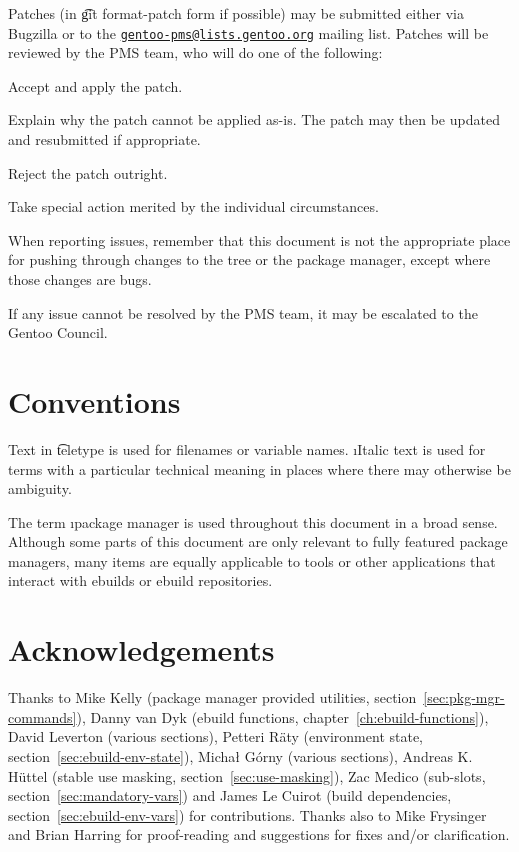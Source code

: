 Patches (in \t{git format-patch} form if possible) may be submitted either via Bugzilla or to the
\href{mailto:gentoo-pms@lists.gentoo.org}{\nolinkurl{gentoo-pms@lists.gentoo.org}} mailing list.
Patches will be reviewed by the PMS team, who will do one of the following:

\begin{compactitem}
\item Accept and apply the patch.
\item Explain why the patch cannot be applied as-is. The patch may then be updated and resubmitted
    if appropriate.
\item Reject the patch outright.
\item Take special action merited by the individual circumstances.
\end{compactitem}

When reporting issues, remember that this document is not the appropriate place for pushing through
changes to the tree or the package manager, except where those changes are bugs.

If any issue cannot be resolved by the PMS team, it may be escalated to the Gentoo Council.

\section{Conventions}

Text in \t{teletype} is used for filenames or variable names. \i{Italic} text is used for terms
with a particular technical meaning in places where there may otherwise be ambiguity.

The term \i{package manager} is used throughout this document in a broad sense. Although some parts
of this document are only relevant to fully featured package managers, many items are equally
applicable to tools or other applications that interact with ebuilds or ebuild repositories.

\section{Acknowledgements}

Thanks to Mike Kelly (package manager provided utilities, section~\ref{sec:pkg-mgr-commands}),
Danny van Dyk (ebuild functions, chapter~\ref{ch:ebuild-functions}), David Leverton (various
sections), Petteri Räty (environment state, section~\ref{sec:ebuild-env-state}), Michał Górny
(various sections), Andreas K. Hüttel (stable use masking, section~\ref{sec:use-masking}),
Zac Medico (sub-slots, section~\ref{sec:mandatory-vars}) and James Le Cuirot (build dependencies,
section~\ref{sec:ebuild-env-vars}) for contributions. Thanks also to Mike Frysinger and
Brian Harring for proof-reading and suggestions for fixes and/or clarification.


